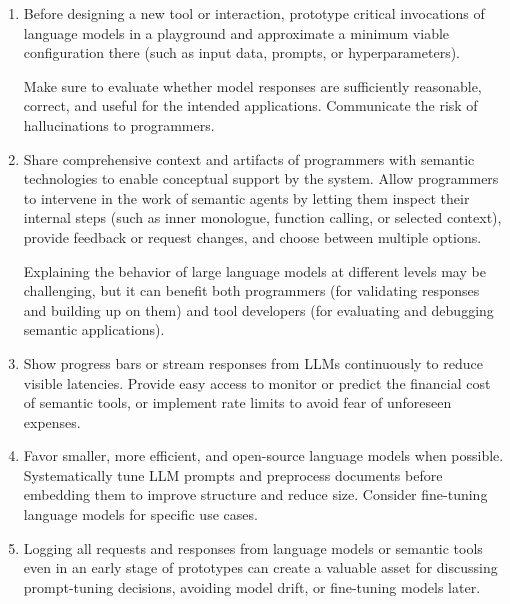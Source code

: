 \begin{enumerate}
	\item {}
	Before designing a new tool or interaction, prototype critical invocations of language models in a playground and approximate a minimum viable configuration there (such as input data, prompts, or hyperparameters).

	Make sure to evaluate whether model responses are sufficiently reasonable, correct, and useful for the intended applications.
	Communicate the risk of hallucinations to programmers.

	\item {}
	Share comprehensive context and artifacts of programmers with semantic technologies to enable conceptual support by the system.
	Allow programmers to intervene in the work of semantic agents by letting them inspect their internal steps (such as inner monologue, function calling, or selected context), provide feedback or request changes, and choose between multiple options.

	Explaining the behavior of large language models at different levels may be challenging, but it can benefit both programmers (for validating responses and building up on them) and tool developers (for evaluating and debugging semantic applications).

	\item {}
	Show progress bars or stream responses from LLMs continuously to reduce visible latencies.
	Provide easy access to monitor or predict the financial cost of semantic tools, or implement rate limits to avoid fear of unforeseen expenses.

	\item {}
	Favor smaller, more efficient, and open-source language models when possible.
	Systematically tune LLM prompts and preprocess documents before embedding them to improve structure and reduce size.
	Consider fine-tuning language models for specific use cases.

	\item {}
	Logging all requests and responses from language models or semantic tools even in an early stage of prototypes can create a valuable asset for discussing prompt-tuning decisions, avoiding model drift, or fine-tuning models later.


\end{enumerate}
